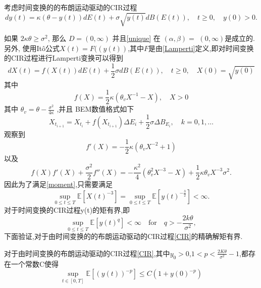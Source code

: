 \begin{example}
	考虑时间变换的的布朗运动驱动的CIR过程
    \begin{equation}\label{CIR}
        dy(t)=\kappa(\theta-y(t))dE(t)+\sigma\sqrt{y(t)}dB(E(t)),\quad t\geq0,\quad y(0)>0.
    \end{equation}
\end{example}
如果 $2\kappa\theta\geq\sigma^{2}$, 那么 $D=(0,\infty)$ 并且\cref{unique} 在 $(\alpha,\beta)=$
$(0,\infty)$是成立的. 
另外, 使用It\^{o}公式$X(t)=F((y(t))$,其中$F$是由\cref{Lamperti}定义,即对时间变换的CIR过程进行Lamperti变换可以得到
\begin{equation}
	dX(t)=f(X(t))dE(t)+\frac12\sigma dB(E(t)),\quad t\geq0,\quad X(0)=\sqrt{y(0)}
\end{equation}
其中
\begin{equation}
	f(X)=\dfrac{1}{2}\kappa\left(\theta_vX^{-1}-X\right),\quad X>0
\end{equation}
其中 $\theta_v=\theta-\frac{\sigma^2}{4\kappa}$ ,并且 BEM数值格式如下
\begin{equation}
	X_{t_{i+1}}=X_{t_{i}}+f(X_{t_{i+1}})\Delta E_i+\frac{1}{2}\sigma\Delta B_{E_i},\quad k=0,1,\dots 
\end{equation}
观察到
\begin{equation}
	f'(X)=-\frac{1}{2}\kappa(\theta_vX^{-2}+1)
\end{equation}
以及
\begin{equation}
	f(X)f'(X)+\frac{\sigma^2}{2}f''(X)=-\frac{\kappa^2}{4}(\theta_v^2X^{-3}-X)+\frac{1}{2}\kappa\theta_vX^{-3}\sigma^2.
\end{equation}
因此为了满足\cref{moment},只需要满足
\begin{equation}
	\sup_{0\leq t\leq T}\mathbb{E}[X(t)^{-3}]=\sup_{0\leq t\leq T}\mathbb{E}[y(t)^{-\frac{3}{2}}] < \infty.
\end{equation}
对于时间变换的CIR过程y(t)的矩有界,即
\begin{equation}
	\sup\limits_{0\leq t\leq T}\mathbb{E}[y(t)^q]<\infty\quad\mathrm{for}\quad q>-\frac{2k\theta}{\sigma^2},
\end{equation}
下面验证,对于由时间变换的的布朗运动驱动的CIR过程\cref{CIR}的精确解矩有界.
\begin{proposition}
	对于由时间变换的布朗运动驱动的CIR过程\cref{CIR},其中$y_0>0$,$1<p<\frac{2K\theta}{\sigma^2}-1$,都存在一个常数C使得
	\begin{equation*}
		\sup\limits_{t\in[0,T]}\mathbb{E}\left[\left(y(t)\right)^{-p}\right]\leq C(1+y(0)^{-p})
	\end{equation*}
\end{proposition}
